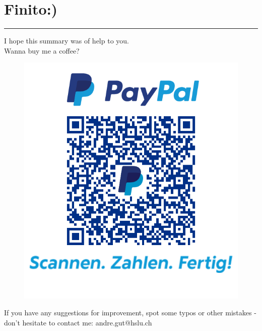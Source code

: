 \section{Finito:)}
\noindent\rule[\linienAbstand]{\linewidth}{\linienDickeDick}
I hope this summary was of help to you.\\
Wanna buy me a coffee?
\begin{figure}[H]
  \centering
  \includegraphics[width=0.5\linewidth]{Pics/qrcode.png}
\end{figure}
If you have any suggestions for improvement, spot some typos or other mistakes - don't hesitate to contact me: andre.gut@hslu.ch
